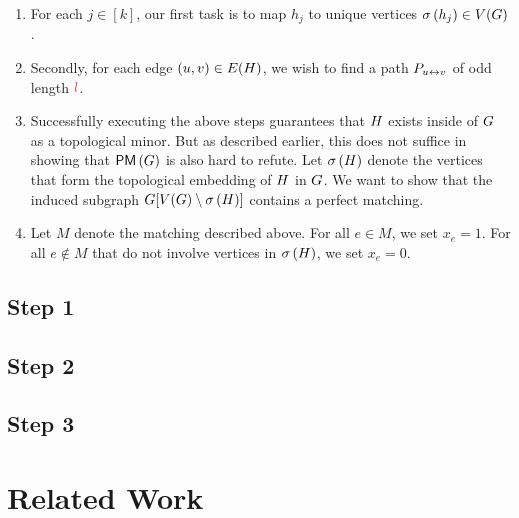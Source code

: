 \documentclass[11pt]{article}
\newcommand{\PerfectMatching}[1]{\mathsf{PM}\left(#1\right)}
\begin{document}
\begin{enumerate}
	\item For each $j \in [k]$, our first task is to map $h_j$ to unique vertices $\sigma\left(h_j\right) \in V(G)$. 
	\item Secondly, for each edge $(u,v) \in E(H)$, we wish to find a path $P_{u \leftrightarrow v}$ of odd length $\textcolor{red}{l}$.
	\item Successfully executing the above steps guarantees that $H$ exists inside of $G$ as a topological minor. But as described earlier, this does not suffice in showing that $\PerfectMatching{\Graph}$ is also hard to refute. Let $\sigma\left(H\right)$ denote the vertices that form the topological embedding of $H$ in $G$. We want to show that the induced subgraph $G[V(G) \setminus \sigma\left(H\right)]$ contains a perfect matching. 
	\item Let $M$ denote the matching described above. For all $e \in M$, we set $x_e =1$. For all $e \notin M$ that do not involve vertices in $\sigma\left(H\right)$, we set $x_e = 0$.
\end{enumerate}

\subsection{Step 1}

\subsection{Step 2}

\subsection{Step 3}

\section{Related Work}

\clearpage


\end{document}
